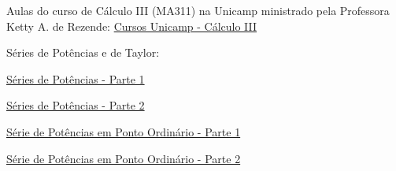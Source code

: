 Aulas do curso de Cálculo III (MA311) na Unicamp ministrado pela Professora Ketty A. de Rezende:
\href{https://www.youtube.com/playlist?list=PLFBA21F349930F92F}{Cursos Unicamp - Cálculo III}

Séries de Potências e de Taylor:
\begin{listlinks}
  \item \href{https://www.youtube.com/watch?v=w1M69ifBFX4&list=PLFBA21F349930F92F&index=42&t=0s}{Séries de Potências - Parte 1}
  \item \href{https://www.youtube.com/watch?v=PXmcPSLZxmQ&list=PLFBA21F349930F92F&index=43&t=0s}{Séries de Potências - Parte 2}
  \item \href{https://www.youtube.com/watch?v=8STPRjedg44&list=PLFBA21F349930F92F&index=44&t=0s}{Série de Potências em Ponto Ordinário - Parte 1}
  \item \href{https://www.youtube.com/watch?v=C1FRI5CRQIo&list=PLFBA21F349930F92F&index=45&t=0s}{Série de Potências em Ponto Ordinário - Parte 2}
\end{listlinks}

